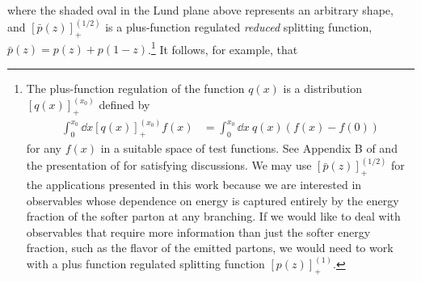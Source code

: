 \documentclass[letterpaper,11pt]{article}
\begin{document}
where the shaded oval in the Lund plane above represents an arbitrary shape, and \([\bar{p}(z)]^{(1/2)}_+\) is a plus-function regulated \textit{reduced} splitting function, \(\bar{p}(z) = p(z) + p(1-z)\).\footnote{
The plus-function regulation of the function \(q(x)\) is a distribution \([q(x)]^{(x_0)}_+\) defined by
\begin{align}
    \int_0^{x_0} \dd x [q(x)]^{(x_0)}_+ f(x)
    &=
    \int_0^{x_0} \dd x ~ q(x) \left(f(x)  - f(0)\right)
\end{align}
%
for any \(f(x)\) in a suitable space of test functions.
%
See Appendix B of  and the presentation of  for satisfying discussions.
%
We may use \([\bar{p}(z)]^{(1/2)}_+\) for the applications presented in this work because we are interested in observables whose dependence on energy is captured entirely by the energy fraction of the softer parton at any branching.
%
If we would like to deal with observables that require more information than just the softer energy fraction, such as the flavor of the emitted partons, we would need to work with a plus function regulated splitting function \([p(z)]^{(1)}_+\).
}
%
It follows, for example, that
%
\end{document}
